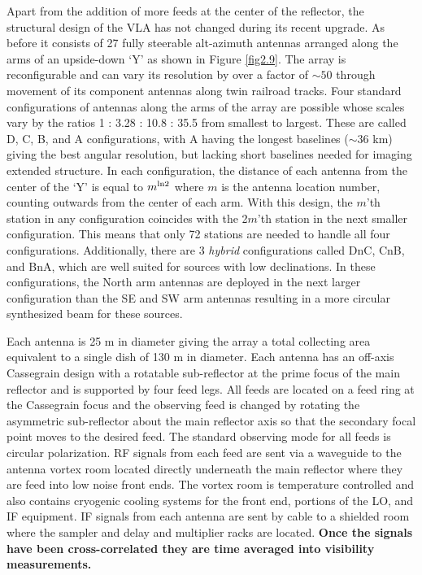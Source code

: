 Apart from the addition of more feeds at the center of the reflector, the structural design of the VLA has not changed during its recent upgrade. As before it consists of 27 fully steerable alt-azimuth antennas arranged along the arms of an upside-down `Y' as shown in Figure \ref{fig2.9}.  The array is reconfigurable and can vary its resolution by over a factor of $\sim 50$ through movement of its component antennas along twin railroad tracks. Four standard configurations of antennas along the arms of the array are possible whose scales vary by the ratios 1 : 3.28 : 10.8 : 35.5 from smallest to largest. These are called D, C, B, and A configurations, with A having the longest baselines ($\sim 36$ km) giving the best angular resolution, but lacking short baselines needed for imaging extended structure. In each configuration, the distance of each antenna from the center of the `Y' is equal to $m^{\rm{ln}2}$ where $m$ is the antenna location number, counting outwards from the center of each arm. With this design, the $m$'th station in any configuration coincides with the 2$m$'th station in the next smaller configuration. This means that only 72 stations are needed to handle all four configurations. Additionally, there are 3 \textit{hybrid} configurations called DnC, CnB, and BnA, which are well suited for sources with low declinations. In these configurations, the North arm antennas are deployed in the next larger configuration than the SE and SW arm antennas resulting in a more circular synthesized beam for these sources.

Each antenna is 25 m in diameter giving the array a total collecting area equivalent to a single dish of 130 m in diameter. Each antenna has an off-axis Cassegrain design with a rotatable sub-reflector at the prime focus of the main reflector and is supported by four feed legs. All feeds are located on a feed ring at the Cassegrain focus and the observing feed is changed by rotating the asymmetric sub-reflector about the main reflector axis so that the secondary focal point moves to the desired feed. The standard observing mode for all feeds is circular polarization. RF signals from each feed  are sent via a waveguide to the antenna vortex room located directly underneath the main reflector where they are feed into low noise front ends. The vortex room is temperature controlled and also contains cryogenic cooling systems for the front end, portions of the LO, and IF equipment. IF signals from each antenna are sent by cable to a shielded room where the sampler and delay and multiplier racks are located. \textbf{Once the signals have been cross-correlated they are time averaged into visibility measurements.}

